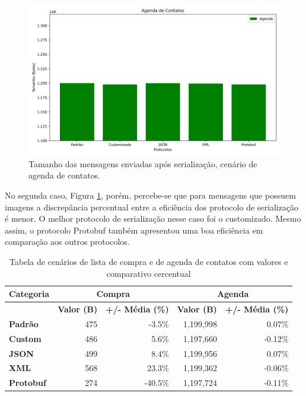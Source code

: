 \documentclass{article}
\begin{document}
\begin{figure}[H]
    \centering
    \includegraphics[width=\textwidth]{imgs/agenda_data_size.png}
    \caption{Tamanho das mensagens enviadas após serialização, cenário de agenda de contatos.}
    \label{fig:agenda}
\end{figure}

No segunda caso, Figura \ref{fig:agenda}, porém, percebe-se que para mensagens que possuem imagens a discrepância percentual entre a eficiência dos protocolo de serialização é menor. O melhor protocolo de serialização nesse caso foi o customizado. Mesmo assim, o protocolo Protobuf também apresentou uma boa eficiência em comparação aos outros protocolos.

\begin{table}[ht]
    \centering
    \begin{tabular}{l|r|r|r|r}
    \hline
    \textbf{Categoria} & \multicolumn{2}{c|}{\textbf{Compra}} & \multicolumn{2}{c|}{\textbf{Agenda}} \\
    \hline
    & \textbf{Valor (B)} & \textbf{+/- Média (\%)} & \textbf{Valor (B)} & \textbf{+/- Média (\%)} \\
    \hline
    \textbf{Padrão}   & 475   & -3.5\%  & 1,199,998  & 0.07\%  \\
    \textbf{Custom}   & 486   & 5.6\%   & 1,197,660  & -0.12\% \\
    \textbf{JSON}     & 499   & 8.4\%   & 1,199,956  & 0.07\%  \\
    \textbf{XML}      & 568   & 23.3\%  & 1,199,362  & -0.06\% \\
    \textbf{Protobuf} & 274   & -40.5\% & 1,197,724  & -0.11\% \\
    \hline
    \end{tabular}
    \caption{Tabela de cenários de lista de compra e de agenda de contatos com valores e comparativo cercentual}
    \label{tabela}
\end{table}
\end{document}
